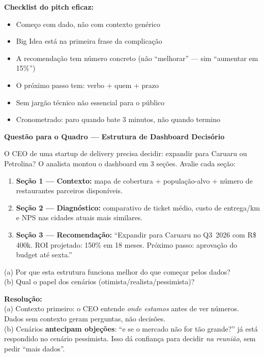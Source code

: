 \begin{SolvedBox}
\textbf{Checklist do pitch eficaz:}
\begin{itemize}
  \item[$\square$] Começo com dado, não com contexto genérico
  \item[$\square$] Big Idea está na primeira frase da complicação
  \item[$\square$] A recomendação tem número concreto (não ``melhorar'' — sim ``aumentar em 15\%'')
  \item[$\square$] O próximo passo tem: verbo + quem + prazo
  \item[$\square$] Sem jargão técnico não essencial para o público
  \item[$\square$] Cronometrado: paro quando bate 3 minutos, não quando termino
\end{itemize}
\end{SolvedBox}

\begin{SolvedBox}
\textbf{Questão para o Quadro — Estrutura de Dashboard Decisório}

O CEO de uma startup de delivery precisa decidir: expandir para
Caruaru ou Petrolina? O analista montou o dashboard em 3 seções.
Avalie cada seção:

\begin{enumerate}
  \item \textbf{Seção 1 — Contexto:} mapa de cobertura + população-alvo
  + número de restaurantes parceiros disponíveis.
  \item \textbf{Seção 2 — Diagnóstico:} comparativo de ticket médio,
  custo de entrega/km e NPS nas cidades atuais mais similares.
  \item \textbf{Seção 3 — Recomendação:} ``Expandir para Caruaru no
  Q3~2026 com R\$ 400k. ROI projetado: 150\% em 18 meses. Próximo
  passo: aprovação do budget até sexta.''
\end{enumerate}

(a) Por que esta estrutura funciona melhor do que começar pelos dados?\\
(b) Qual o papel dos cenários (otimista/realista/pessimista)?

\textbf{Resolução:}\\
(a) Contexto primeiro: o CEO entende \emph{onde estamos} antes de ver
números. Dados sem contexto geram perguntas, não decisões.\\
(b) Cenários \textbf{antecipam objeções}: ``e se o mercado não for
tão grande?'' já está respondido no cenário pessimista. Isso dá
confiança para decidir \emph{na reunião}, sem pedir ``mais dados''.
\end{SolvedBox}

